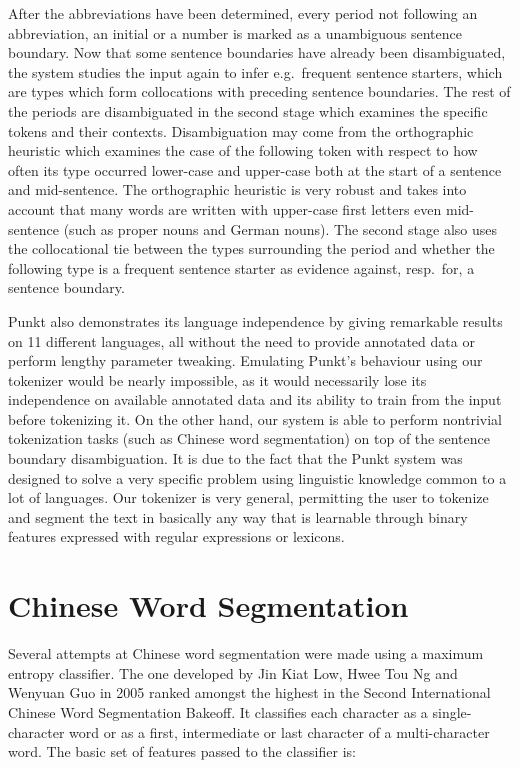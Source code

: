 After the abbreviations have been determined, every period not following an
abbreviation, an initial or a number is marked as a unambiguous sentence
boundary. Now that some sentence boundaries have already been disambiguated,
the system studies the input again to infer e.g.\ frequent sentence starters,
which are types which form collocations with preceding sentence boundaries. The
rest of the periods are disambiguated in the second stage which examines the
specific tokens and their contexts. Disambiguation may come from the
orthographic heuristic which examines the case of the following token with
respect to how often its type occurred lower-case and upper-case both at the
start of a sentence and mid-sentence. The orthographic heuristic is very robust
and takes into account that many words are written with upper-case first
letters even mid-sentence (such as proper nouns and German nouns). The second
stage also uses the collocational tie between the types surrounding the period
and whether the following type is a frequent sentence starter as evidence
against, resp.\ for, a sentence boundary.

Punkt also demonstrates its language independence by giving remarkable results
on 11 different languages, all without the need to provide annotated data or
perform lengthy parameter tweaking. Emulating Punkt's behaviour using our
tokenizer would be nearly impossible, as it would necessarily lose its
independence on available annotated data and its ability to train from the
input before tokenizing it. On the other hand, our system is able to perform
nontrivial tokenization tasks (such as Chinese word segmentation) on top of the
sentence boundary disambiguation. It is due to the fact that the Punkt system
was designed to solve a very specific problem using linguistic knowledge common
to a lot of languages. Our tokenizer is very general, permitting the user to
tokenize and segment the text in basically any way that is learnable through
binary features expressed with regular expressions or lexicons.

\section{Chinese Word Segmentation}
\label{survey-chinese}

Several attempts at Chinese word segmentation were made using a maximum entropy
classifier. The one developed by Jin Kiat Low, Hwee Tou Ng and Wenyuan Guo in
2005 \cite{seg-chinese-maxent} ranked amongst the highest in the Second
International Chinese Word Segmentation Bakeoff. It classifies each character
as a single-character word or as a first, intermediate or last character of a
multi-character word. The basic set of features passed to the classifier is:

